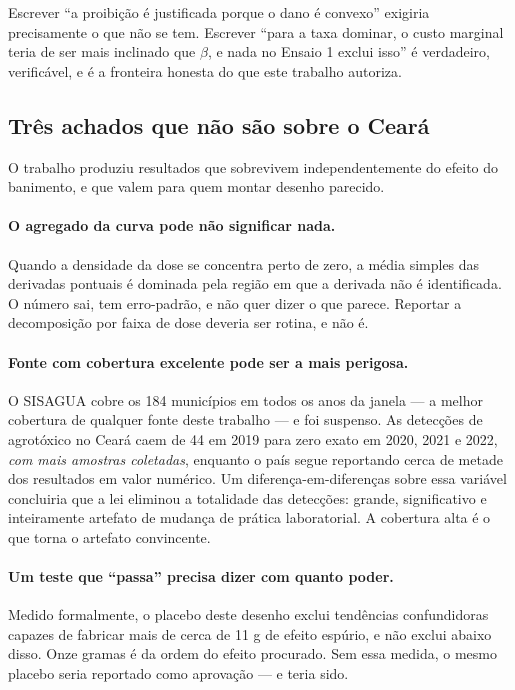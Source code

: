 Escrever ``a proibição é justificada porque o dano é convexo'' exigiria
precisamente o que não se tem. Escrever ``para a taxa dominar, o custo marginal
teria de ser mais inclinado que \(\beta\), e nada no Ensaio 1 exclui isso'' é
verdadeiro, verificável, e é a fronteira honesta do que este trabalho autoriza.

\subsection{Três achados que não são sobre o Ceará}
\label{sub:metodologicos}

O trabalho produziu resultados que sobrevivem independentemente do efeito do
banimento, e que valem para quem montar desenho parecido.

\paragraph{O agregado da curva pode não significar nada.}
Quando a densidade da dose se concentra perto de zero, a média simples das
derivadas pontuais é dominada pela região em que a derivada não é identificada.
O número sai, tem erro-padrão, e não quer dizer o que parece. Reportar a
decomposição por faixa de dose deveria ser rotina, e não é.

\paragraph{Fonte com cobertura excelente pode ser a mais perigosa.}
O SISAGUA cobre os 184 municípios em todos os anos da janela --- a melhor
cobertura de qualquer fonte deste trabalho --- e foi suspenso. As detecções de
agrotóxico no Ceará caem de 44 em 2019 para zero exato em 2020, 2021 e 2022,
\emph{com mais amostras coletadas}, enquanto o país segue reportando cerca de
metade dos resultados em valor numérico. Um diferença-em-diferenças sobre essa
variável concluiria que a lei eliminou a totalidade das detecções: grande,
significativo e inteiramente artefato de mudança de prática laboratorial. A
cobertura alta é o que torna o artefato convincente.

\paragraph{Um teste que ``passa'' precisa dizer com quanto poder.}
Medido formalmente, o placebo deste desenho exclui tendências confundidoras
capazes de fabricar mais de cerca de 11 g de efeito espúrio, e não exclui abaixo
disso. Onze gramas é da ordem do efeito procurado. Sem essa medida, o mesmo
placebo seria reportado como aprovação --- e teria sido.


